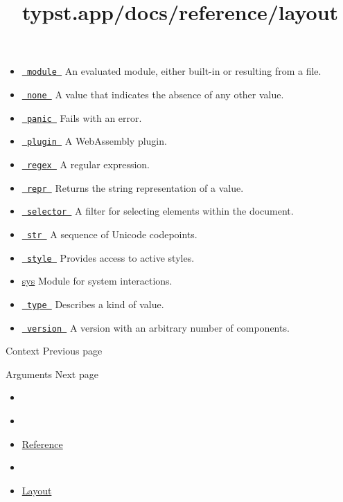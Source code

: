 \begin{itemize}
{  label for an element. }
\item
  \href{/docs/reference/foundations/module/}{\texttt{\ module\ }} { An
  evaluated module, either built-in or resulting from a file. }
\item
  \href{/docs/reference/foundations/none/}{\texttt{\ none\ }} { A value
  that indicates the absence of any other value. }
\item
  \href{/docs/reference/foundations/panic/}{\texttt{\ panic\ }} { Fails
  with an error. }
\item
  \href{/docs/reference/foundations/plugin/}{\texttt{\ plugin\ }} { A
  WebAssembly plugin. }
\item
  \href{/docs/reference/foundations/regex/}{\texttt{\ regex\ }} { A
  regular expression. }
\item
  \href{/docs/reference/foundations/repr/}{\texttt{\ repr\ }} { Returns
  the string representation of a value. }
\item
  \href{/docs/reference/foundations/selector/}{\texttt{\ selector\ }} {
  A filter for selecting elements within the document. }
\item
  \href{/docs/reference/foundations/str/}{\texttt{\ str\ }} { A sequence
  of Unicode codepoints. }
\item
  \href{/docs/reference/foundations/style/}{\texttt{\ style\ }} {
  Provides access to active styles. }
\item
  \href{/docs/reference/foundations/sys}{sys} { Module for system
  interactions. }
\item
  \href{/docs/reference/foundations/type/}{\texttt{\ type\ }} {
  Describes a kind of value. }
\item
  \href{/docs/reference/foundations/version/}{\texttt{\ version\ }} { A
  version with an arbitrary number of components. }
\end{itemize}

\href{/docs/reference/context/}{\pandocbounded{}}

{ Context } { Previous page }

\href{/docs/reference/foundations/arguments/}{\pandocbounded{}}

{ Arguments } { Next page }


\title{typst.app/docs/reference/layout}

\begin{itemize}
\tightlist
\item
  \href{/docs}{}
\item
  
\item
  \href{/docs/reference/}{Reference}
\item
  
\item
  \href{/docs/reference/layout/}{Layout}
\end{itemize}

